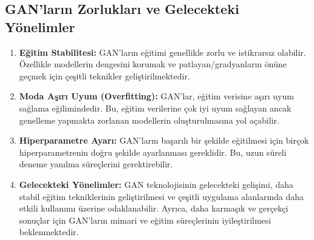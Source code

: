 \documentclass[12pt]{article}
\begin{document}
\subsection{GAN'ların Zorlukları ve Gelecekteki Yönelimler}
\begin{enumerate}[label=\textbf{\arabic*.}, leftmargin=*]
\item\textbf{Eğitim Stabilitesi:} GAN'ların eğitimi genellikle zorlu ve istikrarsız olabilir. Özellikle modellerin dengesini korumak ve patlayan/gradyanların önüne geçmek için çeşitli teknikler geliştirilmektedir.

\item\textbf{Moda Aşırı Uyum (Overfitting):} GAN'lar, eğitim verisine aşırı uyum sağlama eğilimindedir. Bu, eğitim verilerine çok iyi uyum sağlayan ancak genelleme yapmakta zorlanan modellerin oluşturulmasına yol açabilir.

\item\textbf{Hiperparametre Ayarı:} GAN'ların başarılı bir şekilde eğitilmesi için birçok hiperparametrenin doğru şekilde ayarlanması gereklidir. Bu, uzun süreli deneme yanılma süreçlerini gerektirebilir.

\item\textbf{Gelecekteki Yönelimler:} GAN teknolojisinin gelecekteki gelişimi, daha stabil eğitim tekniklerinin geliştirilmesi ve çeşitli uygulama alanlarında daha etkili kullanımı üzerine odaklanabilir. Ayrıca, daha karmaşık ve gerçekçi sonuçlar için GAN'ların mimari ve eğitim süreçlerinin iyileştirilmesi beklenmektedir.
\end{enumerate}
\end{document}
